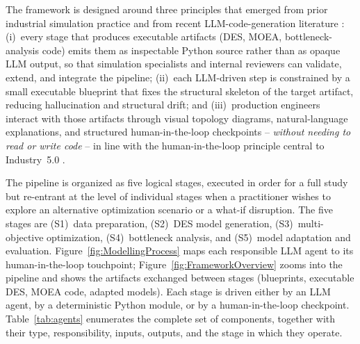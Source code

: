 \documentclass[a4paper,fleqn]{cas-sc}
\begin{document}


  The framework is designed around three principles that emerged from prior industrial simulation practice \citep{Schmitt2026jms,Ragazzini2024cie} and from recent LLM-code-generation literature \citep{Fakhoury2024,Wan2026struct}: (i)~every stage that produces executable artifacts (DES, MOEA, bottleneck-analysis code) emits them as inspectable Python source rather than as opaque LLM output, so that simulation specialists and internal reviewers can validate, extend, and integrate the pipeline; (ii)~each LLM-driven step is constrained by a small executable blueprint that fixes the structural skeleton of the target artifact, reducing hallucination and structural drift; and (iii)~production engineers interact with those artifacts through visual  topology diagrams, natural-language explanations, and structured human-in-the-loop checkpoints -- \emph{without needing to read or write code} -- in line with the human-in-the-loop principle central to Industry~5.0 \citep{Toth2023,Xu2021,Turner2022hitl}.

  The pipeline is organized as five logical stages, executed in order for a full study but re-entrant at the level of   
  individual stages when a practitioner wishes to explore an alternative optimization scenario or a what-if disruption.
  The five stages are (S1)~data preparation, (S2)~DES model generation, (S3)~multi-objective optimization,              
  (S4)~bottleneck analysis, and (S5)~model adaptation and evaluation. Figure~\ref{fig:ModellingProcess} maps each
  responsible LLM agent to its human-in-the-loop touchpoint; Figure~\ref{fig:FrameworkOverview} zooms into the pipeline
  and shows the artifacts exchanged between stages (blueprints, executable DES, MOEA code, adapted models). Each stage
  is driven either by an LLM agent, by a deterministic Python module, or by a human-in-the-loop checkpoint.
  Table~\ref{tab:agents} enumerates the complete set of components, together with their type, responsibility, inputs,
  outputs, and the stage in which they operate.
\end{document}
